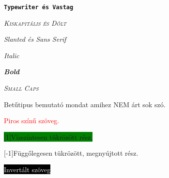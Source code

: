\documentclass[11pt]{article}
\begin{document}
\texttt{\textbf{Typewriter és Vastag}}

\textsc{\textit{Kiskapitális és Dőlt}}

\textsl{\textsf{Slanted és Sans Serif}}

\textit{\emph{Italic}}

\textbf{\emph{Bold}}

\textsc{\emph{Small Caps}}

Betűtipus \Large bemutató \normalsize mondat amihez \MakeUppercase{nem} árt sok szó.

\textcolor{red}{Piros színű szöveg.}

\colorbox{green}{\scalebox{-1}[1]{Vízszintesen tükrözött rész.}}

\scalebox{2}[-1]{Függőlegesen tükrözött, megnyújtott rész.}



\colorbox{black}{\textcolor{white}{Invertált szöveg}}

\end{document}
